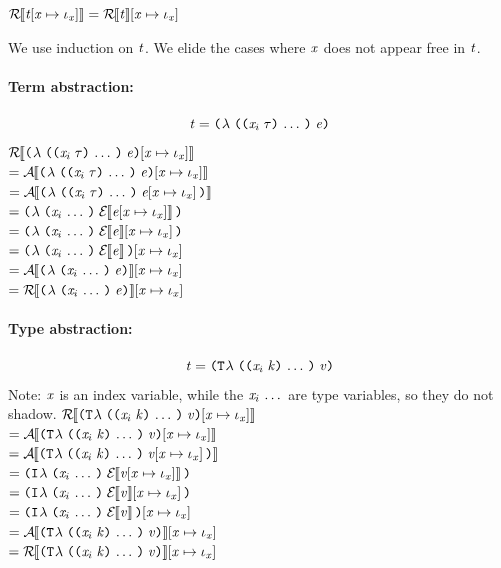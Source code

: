 \begin{lemma}%
  \label{IESubstErase}
  $\mathcal{R}{\hskip-.25em}\left\llbracket \mathit{t}\hspace{-2pt}\left[ \mathit{x} \mapsto \mathit{\iota}_{\mathit{x}} \right] \right\rrbracket = \mathcal{R}{\hskip-.25em}\left\llbracket \mathit{t} \right\rrbracket\hspace{-2pt}\left[ \mathit{x} \mapsto \mathit{\iota}_{\mathit{x}} \right]$
\end{lemma}
\begin{sproof}
  We use induction on $\mathit{t}$.
  We elide the cases where $\mathit{x}$ does not appear free in $\mathit{t}$.

  \paragraph{Term abstraction:}
  \[\term = \lam{\sequence{\notevar{\var_i}{\type}}}{\expr}\]
  $\EraseTrm{\idxsubst{\lam{\sequence{\notevar{\var_i}{\type}}}{\expr}}}$ \\
  $= \EraseA{\idxsubst{\lam{\sequence{\notevar{\var_i}{\type}}}{\expr}}}$ \\
  $= \EraseA{\lam{\sequence{\notevar{\var_i}{\type}}}{\idxsubst{\expr}}}$ \\
  $= \lam{\sequence{\var_i}}{\EraseE{\idxsubst{\expr}}}$ \\
  $= \lam{\sequence{\var_i}}{\idxsubst{\EraseE{\expr}}}$ \\
  $= \idxsubst{\lam{\sequence{\var_i}}{\EraseE{\expr}}}$ \\
  $= \idxsubst{\EraseA{\lam{\sequence{\var_i}}{\expr}}}$ \\
  $= \idxsubst{\EraseTrm{\lam{\sequence{\var_i}}{\expr}}}$ \\

  \paragraph{Type abstraction:}
  \[\term = \tlam{\sequence{\notevar{\var_i}{\kind}}}{\val}\]
  Note: $\mathit{x}$ is an index variable, while the $\mathit{x}_i \, \ldots \,$ are type variables, so they do not shadow.
  $\EraseTrm{\idxsubst{\tlam{\sequence{\notevar{\var_i}{\kind}}}{\val}}}$ \\
  $= \EraseA{\idxsubst{\tlam{\sequence{\notevar{\var_i}{\kind}}}{\val}}}$ \\
  $= \EraseA{\tlam{\sequence{\notevar{\var_i}{\kind}}}{\idxsubst{\val}}}$ \\
  $= \ilam{\sequence{\var_i}}{\EraseE{\idxsubst{\val}}}$ \\
  $= \ilam{\sequence{\var_i}}{\idxsubst{\EraseE{\val}}}$ \\
  $= \idxsubst{\ilam{\sequence{\var_i}}{\EraseE{\val}}}$ \\
  $= \idxsubst{\EraseA{\tlam{\sequence{\notevar{\var_i}{\kind}}}{\val}}}$ \\
  $= \idxsubst{\EraseTrm{\tlam{\sequence{\notevar{\var_i}{\kind}}}{\val}}}$ \\


\end{sproof}
